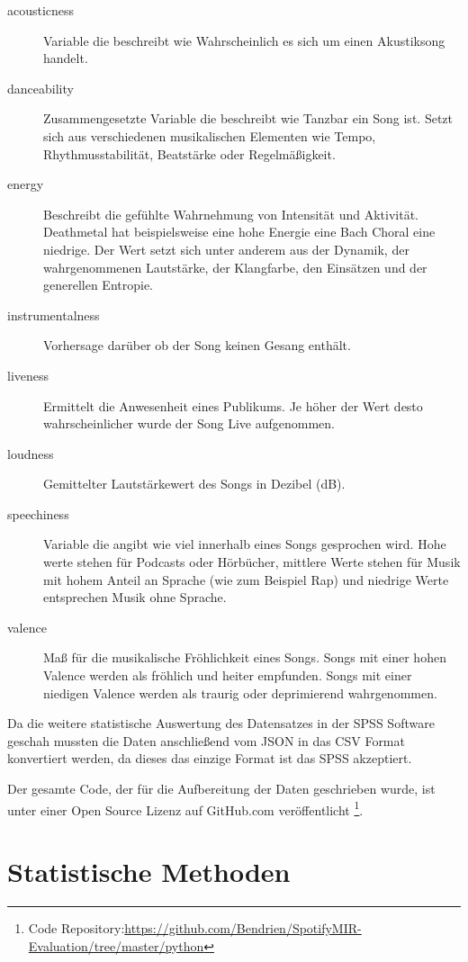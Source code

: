 \begin{description}
    \item[acousticness] Variable die beschreibt wie Wahrscheinlich es sich um einen Akustiksong handelt.
    \item[danceability] Zusammengesetzte Variable die beschreibt wie Tanzbar ein Song ist. Setzt sich aus verschiedenen musikalischen Elementen wie Tempo, Rhythmusstabilität, Beatstärke oder Regelmäßigkeit.
    \item[energy] Beschreibt die gefühlte Wahrnehmung von Intensität und Aktivität. Deathmetal hat beispielsweise eine hohe Energie eine Bach Choral eine niedrige. Der Wert setzt sich unter anderem aus der Dynamik, der wahrgenommenen Lautstärke, der Klangfarbe, den Einsätzen und der generellen Entropie.
    \item[instrumentalness] Vorhersage darüber ob der Song keinen Gesang enthält.
    \item[liveness] Ermittelt die Anwesenheit eines Publikums. Je höher der Wert desto wahrscheinlicher wurde der Song Live aufgenommen.
    \item[loudness] Gemittelter Lautstärkewert des Songs in Dezibel (dB).
    \item[speechiness] Variable die angibt wie viel innerhalb eines Songs gesprochen wird. Hohe werte stehen für Podcasts oder Hörbücher, mittlere Werte stehen für Musik mit hohem Anteil an Sprache (wie zum Beispiel Rap) und niedrige Werte entsprechen Musik ohne Sprache. 
    \item[valence] Maß für die musikalische Fröhlichkeit eines Songs. Songs mit einer hohen Valence werden als fröhlich und heiter empfunden. Songs mit einer niedigen Valence werden als traurig oder deprimierend wahrgenommen.
\end{description}

Da die weitere statistische Auswertung des Datensatzes in der SPSS Software geschah mussten die Daten anschließend vom JSON in das CSV Format konvertiert werden, da dieses das einzige Format ist das SPSS akzeptiert.

Der gesamte Code, der für die Aufbereitung der Daten geschrieben wurde, ist unter einer Open Source Lizenz auf GitHub.com veröffentlicht \footnote{Code Repository:\url{https://github.com/Bendrien/SpotifyMIR-Evaluation/tree/master/python}}.



\section*{Statistische Methoden}
\label{sec:Statistische Methoden}

